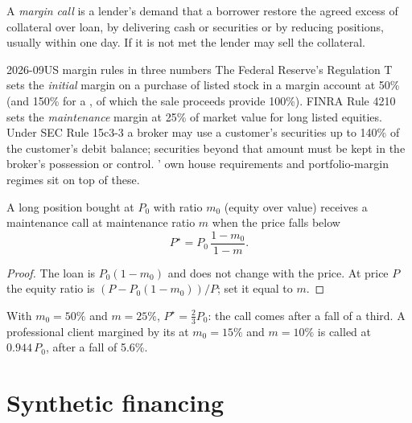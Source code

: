 \begin{definition}\label{def:m1:financing:margincall}
A \emph{margin call} is a lender's demand that a borrower
restore the agreed excess of collateral over loan, by delivering cash or
securities or by reducing positions, usually within one day. If it is not
met the lender may sell the collateral.
\end{definition}

\begin{dated}{2026-09}{US margin rules in three numbers}\label{dat:m1:financing:rules}
The Federal Reserve's Regulation T sets the \emph{initial} margin on a
purchase of listed stock in a margin account at 50\% (and 150\% for a , of which the sale proceeds provide 100\%). FINRA Rule 4210 sets the
\emph{maintenance} margin at 25\% of market value for long listed equities.
Under SEC Rule 15c3-3 a broker may use a customer's securities up to 140\% of
the customer's debit balance; securities beyond that amount must be kept in
the broker's possession or control. ' own house requirements
and portfolio-margin regimes sit on top of these.
\end{dated}

\begin{proposition}\label{prop:m1:financing:call}
A long position bought at $P_0$ with  ratio $m_0$ (equity over
value) receives a maintenance call at maintenance ratio $m$ when the price
falls below
\[
P^\star = P_0\,\frac{1-m_0}{1-m}.
\]
\end{proposition}
\begin{proof}
The loan is $P_0(1-m_0)$ and does not change with the price. At price $P$
the equity ratio is $(P - P_0(1-m_0))/P$; set it equal to $m$.
\end{proof}

\begin{example}\label{ex:m1:financing:regt}
With $m_0 = 50\%$ and $m = 25\%$, $P^\star = \tfrac23 P_0$: the call comes
after a fall of a third. A professional client margined by its 
at $m_0 = 15\%$ and $m = 10\%$ is called at $0.944\,P_0$, after a fall of
5.6\%.
\end{example}

\section{Synthetic financing}

